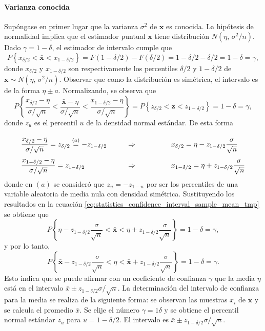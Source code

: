 \documentclass[a4paper]{report}
\newcommand{\x}{\mathbf{x}}
\newcommand{\z}{\mathbf{z}}
\begin{document}
\paragraph{Varianza conocida} Supóngase en primer lugar que la varianza \(\sigma^2\) de \(\x\) es conocida. La hipótesis de normalidad implica que el estimador puntual \(\bar{\x}\) tiene distribución \(N(\eta,\,\sigma^2/n)\). Dado \(\gamma=1-\delta\), el estimador de intervalo cumple que 
\begin{equation}\label{eq:statistics_confidence_interval_sample_mean_tmp}
 P\left\{x_{\delta/2}<\bar{\x}<x_{1-\delta/2}\right\}=F(1-\delta/2)-F(\delta/2)=1-\delta/2-\delta/2=1-\delta=\gamma,
\end{equation}
donde \(x_{\delta/2}\) y \(x_{1-\delta/2}\) son respectivamente los percentiles \(\delta/2\) y \(1-\delta/2\) de \(\x\sim N(\eta,\,\sigma^2/n)\). Observar que como la distribución es simétrica, el intervalo es de la forma \(\eta\pm a\). Normalizando, se observa que 
\[
  P\left\{\frac{x_{\delta/2}-\eta}{\sigma/\sqrt{n}}<\frac{\bar{\x}-\eta}{\sigma/\sqrt{n}}<\frac{x_{1-\delta/2}-\eta}{\sigma/\sqrt{n}}\right\}= P\left\{z_{\delta/2}<\z<z_{1-\delta/2}\right\}=1-\delta=\gamma,
\]
donde \(z_u\) es el percentil \(u\) de la densidad normal estándar. De esta forma
\[
\def\arraystretch{2.4}
\begin{array}{lll}
 \dfrac{x_{\delta/2}-\eta}{\sigma/\sqrt{n}}=z_{\delta/2}\overset{(a)}{=}-z_{1-\delta/2}
 &\qquad\Rightarrow\qquad\qquad
 &x_{\delta/2}=\eta-z_{1-\delta/2}\dfrac{\sigma}{\sqrt{n}}\\
 \dfrac{x_{1-\delta/2}-\eta}{\sigma/\sqrt{n}}=z_{1-\delta/2}
 &\qquad\Rightarrow\qquad\qquad
 &x_{1-\delta/2}=\eta+z_{1-\delta/2}\dfrac{\sigma}{\sqrt{n}}
\end{array}
\]
donde en \((a)\) se consideró que \(z_u=-z_{1-u}\) por ser los percentiles de una variable aleatoria de media nula con densidad simétrica. Sustituyendo los resultados en la ecuación \ref{eq:statistics_confidence_interval_sample_mean_tmp} se obtiene que 
\[
 P\left\{\eta-z_{1-\delta/2}\dfrac{\sigma}{\sqrt{n}}<\bar{\x}<\eta+z_{1-\delta/2}\dfrac{\sigma}{\sqrt{n}}\right\}=1-\delta=\gamma,
\]
y por lo tanto,
\begin{equation}\label{eq:statistics_confidence_interval_for_mean}
 P\left\{\bar{\x}-z_{1-\delta/2}\dfrac{\sigma}{\sqrt{n}}<\eta<\bar{\x}+z_{1-\delta/2}\dfrac{\sigma}{\sqrt{n}}\right\}=1-\delta=\gamma.
\end{equation}
Esto indica que se puede afirmar con un coeficiente de confianza \(\gamma\) que la media \(\eta\) está en el intervalo \(\bar{x}\pm z_{1-\delta/2}\sigma/\sqrt{n}\). La determinación del intervalo de confianza para la media se realiza de la siguiente forma: se observan las muestras \(x_i\) de \(\x\) y se calcula el promedio \(\bar{x}\). Se elije el número \(\gamma=1\delta\) y se obtiene el percentil normal estándar \(z_u\) para \(u=1-\delta/2\). El intervalo es \(\bar{x}\pm z_{1-\delta/2}\sigma/\sqrt{n}\).
\end{document}

